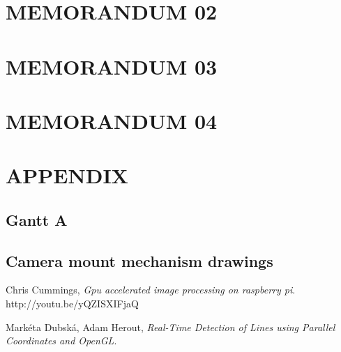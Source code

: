\documentclass[paper=A4, fontsize=11pt, titlepage]{article}
\numberwithin{equation}{section}
\numberwithin{figure}{section}
\numberwithin{table}{section}
\newcommand*{\sectionpostamble}{}
\newcommand*{\fromto}[1]{\def\sectionpostamble{#1}}
\begin{document}




\clearpage


\fromto{May 5 - May 9}
\section{MEMORANDUM 02}




\clearpage


\fromto{May 12 - May 16}
\section{MEMORANDUM 03}




\clearpage


\fromto{May 19 - May 23}
\section{MEMORANDUM 04}




\clearpage

\section{APPENDIX}
\subsection{Gantt A}

\subsection{Camera mount mechanism drawings}



\clearpage

\begin{thebibliography}{9}
	Chris Cummings,
	\emph{Gpu accelerated image processing on raspberry pi}. http://youtu.be/yQZISXIFjaQ

	Markéta Dubská, Adam Herout,
	\emph{Real-Time Detection of Lines using Parallel Coordinates and OpenGL}. 

\end{thebibliography}
\end{document}
